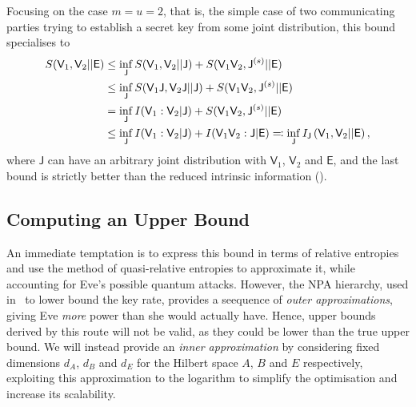 \documentclass[10pt, a4paper]{article}
\numberwithin{equation}{section} %
\theoremstyle{definition}
\theoremstyle{plain}
\newcommand{\?}{\mathrel{?}} %
\newcommand{\crv}[1]{\mathsf{#1}}
\begin{document}
    Focusing on the case \(m = u = 2\), that is, the simple case of two communicating parties trying to establish a secret key from some joint distribution, this bound specialises to
    \begin{align}
      S(\crv{V}_1, \crv{V}_2||\crv{E}) &\leq \inf_\crv{J} S(\crv{V}_1, \crv{V}_2||\crv{J}) + S(\crv{V}_1\crv{V}_2, \crv{J}^{(s)}||\crv{E}) \\
                     &\leq \inf_\crv{J} S(\crv{V}_1\crv{J}, \crv{V}_2\crv{J}||\crv{J}) + S(\crv{V}_1\crv{V}_2, \crv{J}^{(s)}||\crv{E}) \\
                     &= \inf_\crv{J} I(\crv{V}_1 : \crv{V}_2|\crv{J}) + S(\crv{V}_1\crv{V}_2, \crv{J}^{(s)}||\crv{E}) \\
                     &\leq \inf_\crv{J} I(\crv{V}_1 : \crv{V}_2|\crv{J}) + I(\crv{V}_1\crv{V}_2 : \crv{J}|\crv{E}) \eqqcolon \inf_{\crv{J}} \splitkey{\crv{V}_1,\crv{V}_2}{\crv{E}},
    \end{align}
    where \(\crv{J}\) can have an arbitrary joint distribution with \(\crv{V}_1\), \(\crv{V}_2\) and \(\crv{E}\), and the last bound is strictly better than the reduced intrinsic information ().

    \subsection{Computing an Upper Bound}

    An immediate temptation is to express this bound in terms of relative entropies and use the method of quasi-relative entropies to approximate it, while accounting for Eve's possible quantum attacks. However, the NPA hierarchy, used in~\cite{BFF_QRE} to lower bound the key rate, provides a seequence of \emph{outer approximations}, giving Eve \emph{more} power than she would actually have. Hence, upper bounds derived by this route will not be valid, as they could be lower than the true upper bound. We will instead provide an \emph{inner approximation} by considering fixed dimensions \(d_A\), \(d_B\) and \(d_E\) for the Hilbert space \(A\), \(B\) and \(E\) respectively, exploiting this approximation to the logarithm to simplify the optimisation and increase its scalability.
\end{document}
